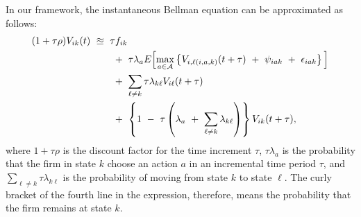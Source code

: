 In our framework, the instantaneous Bellman equation can be approximated as follows:
\begin{equation*}
\begin{split}
    (1 + \tau \rho) V_{ik} (t) \
    & \approxeq \ \tau f_{ik} \\
    & \hspace{0.7cm} + \ \tau \lambda_{a} E\Big[ \underset{a \in \mathcal{A}}{\max} \left\{ V_{i,\ell(i, a, k)} (t + \tau) \ + \ \psi_{iak} \ + \ \epsilon_{iak} \right\} \Big] \\
    & \hspace{0.7cm} + \ \sum_{\ell \neq k} \tau \lambda_{k\ell} V_{i\ell}(t + \tau) \\
    & \hspace{0.7cm} + \ \left\{ 1 \ - \ \tau \left( \lambda_{a} \ + \ \sum_{\ell \neq k} \lambda_{k\ell} \right) \right\} V_{ik} (t + \tau),
\end{split}
\end{equation*}
where $1 + \tau \rho$ is the discount factor for the time increment $\tau$, $\tau \lambda_{a}$ is the probability that the firm in state $k$ choose an action $a$ in an incremental time period $\tau$, and $\sum_{\ell \neq k} \tau \lambda_{k\ell}$ is the probability of moving from state $k$ to state $\ell$. The curly bracket of the fourth line in the expression, therefore, means the probability that the firm remains at state $k$. 

